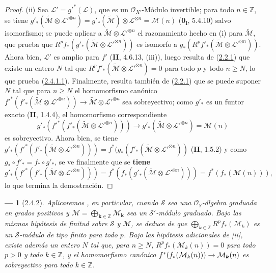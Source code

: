 \documentclass[10pt,oneside,openany]{book}
\theoremstyle{egaenv}\newtheorem*{env}{---}
\theoremstyle{egastatement}
\theoremstyle{egadescription}
\newcommand{\oldpage}[2][]{\marginnote{\normalfont\scriptsize\textbf{#1}\,|\,#2}\ignorespaces}
\renewcommand{\geq}{\geqslant}
\renewcommand{\to}{\mathchoice{\longrightarrow}{\rightarrow}{\rightarrow}{\rightarrow}}
\begin{document}
\begin{proof}
(ii) Sea $\mathcal L'=g'^*(\mathcal L)$, que es un
$\mathcal O_{X'}$-Módulo invertible; para todo $n\in\mathbb Z$, se tiene
$g'_*(\widetilde{\mathcal M}\otimes\mathcal L'^{\otimes n})
=g'_*(\widetilde{\mathcal M})\otimes\mathcal L^{\otimes n}
=\mathcal M(n)$
(\textbf{0}\textsubscript{I}, 5.4.10) salvo isomorfismo; se puede aplicar
a $\widetilde{\mathcal M}\otimes\mathcal L'^{\otimes n}$ el
razonamiento hecho en (i) para $\widetilde{\mathcal M}$, que prueba que
$R^pf_*(g'_*(\widetilde{\mathcal M}\otimes\mathcal L'^{\otimes n}))$
es isomorfo a
$g_*(R^pf'_*(\widetilde{\mathcal M}\otimes\mathcal L'^{\otimes n}))$.
Ahora bien, $\mathcal L'$ es amplio para $f'$ (\textbf{II}, 4.6.13, (iii)), luego resulta
de (\hyperref[III.2.2.1-fr]{2.2.1}) que existe un entero $N$ tal que
$R^pf'_*(\widetilde{\mathcal M}\otimes\mathcal L'^{\otimes n})=0$
para todo $p$ y todo $n\geq N$, lo que prueba
(\hyperref[III.2.4.1.1-fr]{2.4.1.1}). Finalmente, resulta también de
(\hyperref[III.2.2.1-fr]{2.2.1}) que se puede suponer $N$ tal que para
$n\geq N$ el homomorfismo canónico
$f'^*(f'_*(\widetilde{\mathcal M}\otimes\mathcal L'^{\otimes n}))
\longrightarrow\widetilde{\mathcal M}\otimes\mathcal L'^{\otimes n}$
sea sobreyectivo; como $g'_*$ es un funtor exacto (\textbf{II}, 1.4.4),
el homomorfismo correspondiente
\[
g'_*(f'^*(f'_*(\widetilde{\mathcal M}\otimes
\mathcal L'^{\otimes n})))
\longrightarrow
g'_*(\widetilde{\mathcal M}\otimes\mathcal L'^{\otimes n})
=\mathcal M(n)
\]
es sobreyectivo. Ahora bien, se tiene
$g'_*(f'^*(f'_*(\widetilde{\mathcal M}\otimes
\mathcal L'^{\otimes n})))
=f^*(g_*(f'_*(\widetilde{\mathcal M}\otimes
\mathcal L'^{\otimes n}))$
(\textbf{II}, 1.5.2) y como $g_*\circ f'_* = f_*\circ g'_*$, se ve
finalmente que se \textbf{tiene}
\[
g'_*(f'^*(f'_*(\widetilde{\mathcal M}\otimes\mathcal L'^{\otimes n})))
=f^*(f_*(g'_*(\widetilde{\mathcal M}\otimes
\mathcal L'^{\otimes n})))=f^*(f_*(\mathcal M(n))),
\]
lo que termina la demostración.
\end{proof}

\begin{env}[2.4.2]
\label{III.2.4.2}
\label{III.2.4.2-fr}
Aplicaremos , en particular, cuando $\mathcal S$ sea una $\mathcal O_Y$-álgebra \emph{graduada} en grados positivos y
$\mathcal M=\bigoplus_{\boldsymbol{k}\in\mathbb Z}\mathcal M_{\boldsymbol{k}}$
sea un $\mathcal S'$-módulo \emph{graduado}.
\oldpage[III]{109}
Bajo las mismas hipótesis de finitud sobre $\mathcal S$ y $\mathcal M$, se deduce de  que
$\bigoplus_{k\in\mathbb Z}R^pf_*(\mathcal M_k)$
es un $\mathcal S$-módulo \emph{de tipo finito} para todo $p$.
Bajo las hipótesis adicionales de [ii], existe además un entero $N$ tal que, para $n\geq N$,
$R^pf_*(\mathcal M_k(n))=0$
para todo $p>0$ y \emph{todo} $k\in\mathbb Z$, y el homomorfismo canónico
$f^*(f_*(\mathcal M_k(n)))\to\mathcal M_{\boldsymbol{k}}(n)$
es sobreyectivo para \emph{todo} $k\in\mathbb Z$.
\end{env}
\end{document}
